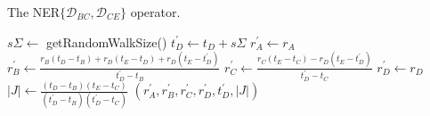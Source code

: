 \documentclass[12pt]{article}
\begin{document}
\begin{algorithm}
\caption{The NER$\{ \mathcal{D}_{BC}, \mathcal{D}_{CE} \}$ operator.}
\begin{algorithmic}[1]


	\State
    \State $s\Sigma \leftarrow $ getRandomWalkSize() 
    \State $t_D^\prime \leftarrow t_D + s\Sigma$ 
    \State
    \State $r_A^\prime \leftarrow r_A$ 
    \State $r_B^\prime \leftarrow \frac{r_B(t_D - t_B) + r_D(t_E - t_D) + r_D(t_E - t_D^\prime)}{t_D^\prime - t_B}$
    \State $r_C^\prime \leftarrow \frac{r_C(t_E - t_C) - r_D(t_E - t_D^\prime)}{t_D^\prime - t_C}$
    \State $r_D^\prime \leftarrow r_D$
    \State
    \State $|J| \leftarrow \frac{(t_D - t_B)(t_E - t_C)}{(t_D^\prime - t_B)(t_D^\prime - t_C)}$ 
    \State \Return $(r_A^\prime, r_B^\prime, r_C^\prime, r_D^\prime, t_D^\prime, |J|)$
    
\EndProcedure

\end{algorithmic}
\label{alg:NER1}
\end{algorithm}



\end{document}
